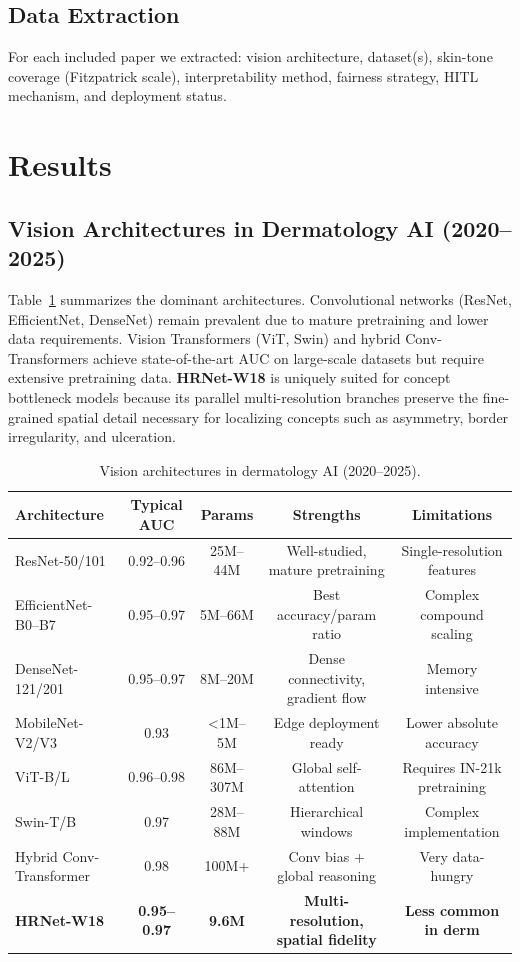 \documentclass[12pt,a4paper]{article}
\begin{document}
\subsection{Data Extraction}
For each included paper we extracted: vision architecture, dataset(s), skin-tone coverage (Fitzpatrick scale), interpretability method, fairness strategy, HITL mechanism, and deployment status.

\section{Results}
\label{sec:results}

\subsection{Vision Architectures in Dermatology AI (2020--2025)}

Table~\ref{tab:vision_models} summarizes the dominant architectures. Convolutional networks (ResNet, EfficientNet, DenseNet) remain prevalent due to mature pretraining and lower data requirements. Vision Transformers (ViT, Swin) and hybrid Conv-Transformers achieve state-of-the-art AUC on large-scale datasets but require extensive pretraining data. \textbf{HRNet-W18} is uniquely suited for concept bottleneck models because its parallel multi-resolution branches preserve the fine-grained spatial detail necessary for localizing concepts such as asymmetry, border irregularity, and ulceration.

\begin{table}[htbp]
\centering
\caption{Vision architectures in dermatology AI (2020--2025).}
\label{tab:vision_models}
\begin{tabular}{lcccc}
\toprule
\textbf{Architecture} & \textbf{Typical AUC} & \textbf{Params} & \textbf{Strengths} & \textbf{Limitations} \\
\midrule
ResNet-50/101 & 0.92--0.96 & 25M--44M & Well-studied, mature pretraining & Single-resolution features \\
EfficientNet-B0--B7 & 0.95--0.97 & 5M--66M & Best accuracy/param ratio & Complex compound scaling \\
DenseNet-121/201 & 0.95--0.97 & 8M--20M & Dense connectivity, gradient flow & Memory intensive \\
MobileNet-V2/V3 & 0.93 & <1M--5M & Edge deployment ready & Lower absolute accuracy \\
ViT-B/L & 0.96--0.98 & 86M--307M & Global self-attention & Requires IN-21k pretraining \\
Swin-T/B & 0.97 & 28M--88M & Hierarchical windows & Complex implementation \\
Hybrid Conv-Transformer & 0.98 & 100M+ & Conv bias + global reasoning & Very data-hungry \\
\textbf{HRNet-W18} & \textbf{0.95--0.97} & \textbf{9.6M} & \textbf{Multi-resolution, spatial fidelity} & \textbf{Less common in derm} \\
\bottomrule
\end{tabular}
\end{table}
\end{document}
